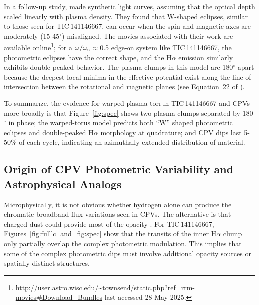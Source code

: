 \documentclass[11pt,twocolumn,tighten,linenumbers]{aastex7}
\begin{document}
In a follow-up study, \citet{Townsend2008} made synthetic light
curves, assuming that the optical depth scaled linearly with plasma
density.  They found that W-shaped eclipses, similar to those seen for
TIC\,141146667, can occur when the spin and magnetic axes are
moderately (15-45$^\circ$) misaligned.  The movies associated with
their work are available
online\footnote{\url{http://user.astro.wisc.edu/\~townsend/static.php?ref=rrm-movies\#Download\_Bundles}
last accessed 28 May 2025.}; for a $\omega/\omega_{\rm
c}$$\approx$0.5 edge-on system like TIC\,141146667, the photometric
eclipses have the correct shape, and the H$\alpha$ emission similarly
exhibits double-peaked behavior.  The plasma clumps in this model are
180$^\circ$ apart because the deepest local minima in the effective
potential exist along the line of intersection between the rotational
and magnetic planes (see Equation~22 of \citealt{Townsend2005}).  

To summarize, the evidence for warped plasma tori in TIC\,141146667
and CPVs more broadly is that Figure~\ref{fig:spec} shows two plasma
clumps separated by 180$^\circ$ in phase; the warped-torus model
predicts both ``W'' shaped photometric eclipses and double-peaked
H$\alpha$ morphology at quadrature; and CPV dips last 5-50\% of each
cycle, indicating an azimuthally extended distribution of material.

\subsection{Origin of CPV Photometric Variability and Astrophysical Analogs}

Microphysically, it is not obvious whether hydrogen alone can produce
the chromatic broadband flux variations seen in CPVs.  The alternative
is that charged dust could provide most of the opacity
\citep{Sanderson2023}.  For TIC\,141146667, Figures~\ref{fig:fulllc}
and~\ref{fig:spec} show that the transits of the inner H$\alpha$ clump
only partially overlap the complex photometric modulation.  This
implies that some of the complex photometric dips must involve
additional opacity sources or spatially distinct structures.
\end{document}

